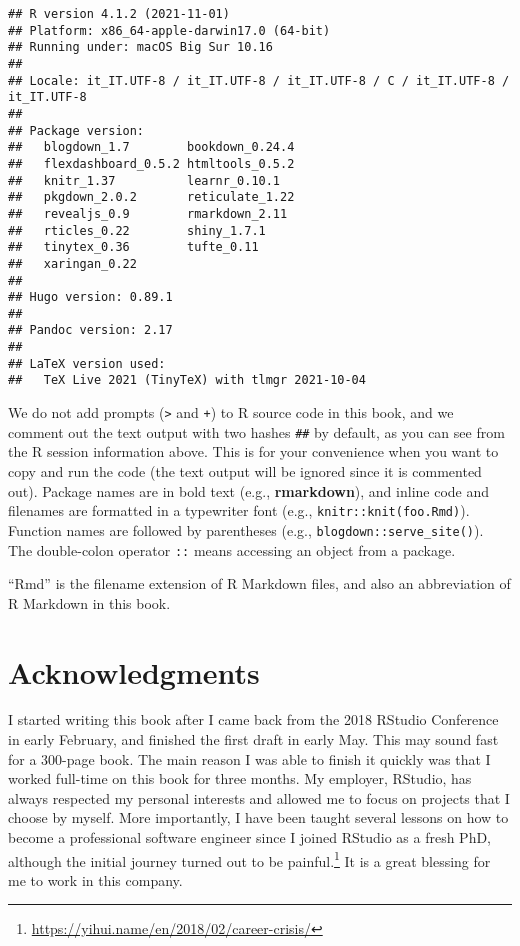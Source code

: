 \documentclass[
  11pt,
]{krantz}
\renewcommand{\href}[2]{#2\footnote{\url{#1}}}
\theoremstyle{definition}
\theoremstyle{definition}
\theoremstyle{definition}
\theoremstyle{definition}
\theoremstyle{remark}
\begin{document}
\begin{verbatim}
## R version 4.1.2 (2021-11-01)
## Platform: x86_64-apple-darwin17.0 (64-bit)
## Running under: macOS Big Sur 10.16
## 
## Locale: it_IT.UTF-8 / it_IT.UTF-8 / it_IT.UTF-8 / C / it_IT.UTF-8 / it_IT.UTF-8
## 
## Package version:
##   blogdown_1.7        bookdown_0.24.4    
##   flexdashboard_0.5.2 htmltools_0.5.2    
##   knitr_1.37          learnr_0.10.1      
##   pkgdown_2.0.2       reticulate_1.22    
##   revealjs_0.9        rmarkdown_2.11     
##   rticles_0.22        shiny_1.7.1        
##   tinytex_0.36        tufte_0.11         
##   xaringan_0.22      
## 
## Hugo version: 0.89.1
## 
## Pandoc version: 2.17
## 
## LaTeX version used: 
##   TeX Live 2021 (TinyTeX) with tlmgr 2021-10-04
\end{verbatim}

We do not add prompts (\texttt{\textgreater{}} and \texttt{+}) to R source code in this book, and we comment out the text output with two hashes \texttt{\#\#} by default, as you can see from the R session information above. This is for your convenience when you want to copy and run the code (the text output will be ignored since it is commented out). Package names are in bold text (e.g., \textbf{rmarkdown}), and inline code and filenames are formatted in a typewriter font (e.g., \texttt{knitr::knit(\textquotesingle{}foo.Rmd\textquotesingle{})}). Function names are followed by parentheses (e.g., \texttt{blogdown::serve\_site()}). The double-colon operator \texttt{::} means accessing an object from a package.

``Rmd'' is the filename extension of R Markdown files, and also an abbreviation of R Markdown in this book.

\hypertarget{acknowledgments}{%
\section*{Acknowledgments}\label{acknowledgments}}


I started writing this book after I came back from the 2018 RStudio Conference in early February, and finished the first draft in early May. This may sound fast for a 300-page book. The main reason I was able to finish it quickly was that I worked full-time on this book for three months. My employer, RStudio, has always respected my personal interests and allowed me to focus on projects that I choose by myself. More importantly, I have been taught several lessons on how to become a professional software engineer since I joined RStudio as a fresh PhD, although \href{https://yihui.name/en/2018/02/career-crisis/}{the initial journey turned out to be painful.} It is a great blessing for me to work in this company.
\end{document}
